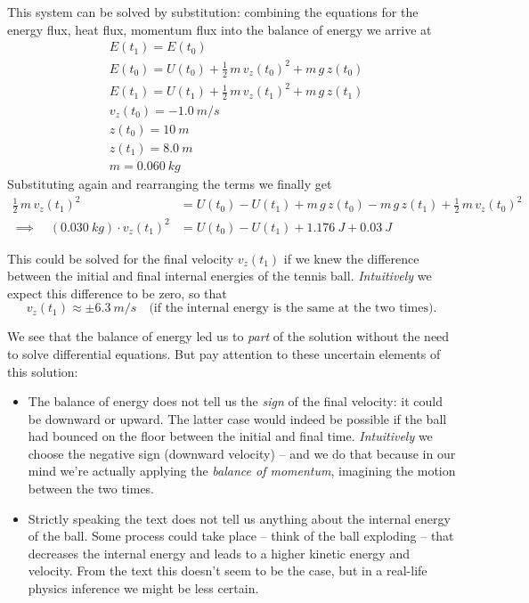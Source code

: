 \documentclass[a4paper,12pt,%
onecolumn,oneside,%
british%
]{memoir}
\renewcommand*{\|}[1][]{\nonscript\:#1\vert\nonscript\:\mathopen{}}
\newcommand*{\yti}{t_{0}}
\newcommand*{\ytf}{t_{1}}
\newcommand*{\ym}{m}%
\newcommand*{\yE}{E}
\newcommand*{\yU}{U}
\begin{document}
This system can be solved by substitution: combining the equations for the energy flux, heat flux, momentum flux into the balance of energy we arrive at
\begin{equation*}
  \begin{aligned}
    & \yE(\ytf) = \yE(\yti)
    \\
    & \yE(\yti) =
    \yU(\yti) + \frac{1}{2}\,\ym\, v_{z}(\yti)^{2} + \ym\, g\, z(\yti)
    \\
    & \yE(\ytf) =
    \yU(\ytf) + \frac{1}{2}\,\ym\, v_{z}(\ytf)^{2} + \ym\, g\, z(\ytf)
    \\
    & v_{z}(\yti) = -\qty{1.0}{m/s}
    \\
    & z(\yti) = \qty{10}{m}
    \\
    & z(\ytf) = \qty{8.0}{m}
    \\
    & \ym = \qty{0.060}{kg}
  \end{aligned}
\end{equation*}
Substituting again and rearranging the terms we finally get
\begin{equation*}
  \begin{aligned}
    \frac{1}{2}\,\ym\, v_{z}(\ytf)^{2}
    &= \yU(\yti) -\yU(\ytf)
    + \ym\, g\, z(\yti) - \ym\, g\, z(\ytf)
    + \frac{1}{2}\,\ym\, v_{z}(\yti)^{2}
    \\
    \implies\quad
    (\qty{0.030}{kg})\cdot v_{z}(\ytf)^{2}
    &= \yU(\yti) -\yU(\ytf)
    + \qty{1.176}{J}
    + \qty{0.03}{J}
  \end{aligned}
\end{equation*}

This could be solved for the final velocity $v_{z}(\ytf)$ if we knew the difference between the initial and final internal energies of the tennis ball. \emph{Intuitively} we expect this difference to be zero, so that
\begin{equation*}
  v_{z}(\ytf) \approx \pm\qty{6.3}{m/s}
  \quad\text{(if the internal energy is the same at the two times).}
\end{equation*}

We see that the balance of energy led us to \emph{part} of the solution without the need to solve differential equations. But pay attention to these uncertain elements of this solution:
\begin{itemize}[nosep]
\item The balance of energy does not tell us the \emph{sign} of the final velocity: it could be downward or upward. The latter case would indeed be possible if the ball had bounced on the floor between the initial and final time. \emph{Intuitively} we choose the negative sign (downward velocity) -- and we do that because in our mind we're actually applying the \emph{balance of momentum}, imagining the motion between the two times.
\item Strictly speaking the text does not tell us anything about the internal energy of the ball. Some process could take place -- think of the ball exploding -- that decreases the internal energy and leads to a higher kinetic energy and velocity. From the text this doesn't seem to be the case, but in a real-life physics inference we might be less certain.
\end{itemize}
\end{document}
